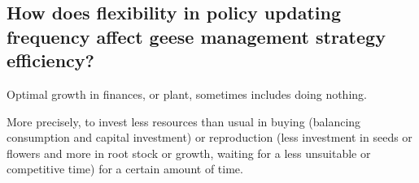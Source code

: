 \documentclass[12pt,a4paper]{article}
\begin{document}
\subsection{How does flexibility in policy updating frequency affect geese management strategy efficiency?}
Optimal growth in finances, or plant, sometimes includes doing nothing.


More precisely, to invest less resources than usual in buying (balancing consumption and capital investment) or reproduction (less investment in seeds or flowers and more in root stock or growth, waiting for a less unsuitable or competitive time) for a certain amount of time.

\end{document}
